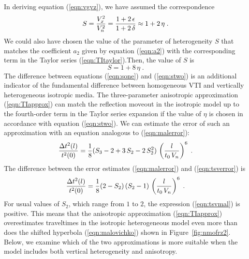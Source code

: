 
\par
In deriving equation (\ref{eqn:vgvz}), we have assumed the correspondence
\begin{equation}
S =  {V_x^2 \over V_n^2} = 
{{1 + 2\,\epsilon} \over {1 + 2\,\delta}} \approx 1 + 2\,\eta\;.
\label{eqn:sone}
\end{equation}
We could also have chosen the value of the parameter of heterogeneity $S$ that
matches the coefficient $a_2$ given by equation (\ref{eqn:a2}) with
the corresponding term in the Taylor series (\ref{eqn:TItaylor}).Then, the value of $S$ is \cite[]{GEO62-06-18391854}
\begin{equation}
S = 1 + 8\,\eta\;.
\label{eqn:stwo}
\end{equation}
The difference between equations (\ref{eqn:sone}) and (\ref{eqn:stwo}) is an
additional indicator of the fundamental difference between homogeneous 
VTI and vertically heterogeneous isotropic media. The three-parameter 
anisotropic approximation (\ref{eqn:TIapprox}) can match the
reflection moveout in the isotropic model up to 
the fourth-order term in the Taylor series expansion if the value of
$\eta$ is chosen in accordance with equation (\ref{eqn:stwo}). We can
estimate the error of such an approximation with an equation analogous
to (\ref{eqn:malerror}): 
\begin{equation}
{{\Delta t^2(l)} \over t^2(0)} = {1 \over 8} (S_3-2 + 3\,S_2-2\,S_2^2)\,
\left({l \over {t_0\,V_n}}\right)^6\;.
\label{eqn:tsverror}
\end{equation}
The difference between the error estimates (\ref{eqn:malerror}) and
(\ref{eqn:tsverror}) is
\begin{equation}
{{\Delta t^2(l)} \over t^2(0)} = {1 \over 8} (2 - S_2)\,(S_2-1)\,
\left({l \over {t_0\,V_n}}\right)^6\;.
\label{eqn:tsvmal}
\end{equation}
For usual values of 
$S_2$, which range from $1$ to $2$, the expression (\ref{eqn:tsvmal}) is 
positive. This means that the anisotropic approximation
(\ref{eqn:TIapprox}) overestimates traveltimes in the isotropic
heterogeneous model even more than does the shifted hyperbola 
(\ref{eqn:malovichko}) shown in Figure~\ref{fig:nmofrz2}. 
Below, we examine which of the two approximations is more suitable when
the model includes both vertical heterogeneity and anisotropy.

